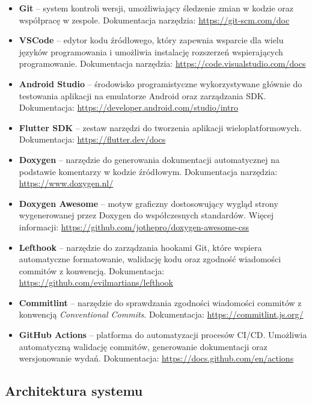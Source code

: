 \begin{itemize}
	\item \textbf{Git} – system kontroli wersji, umożliwiający śledzenie zmian w kodzie oraz współpracę w zespole. Dokumentacja narzędzia: \url{https://git-scm.com/doc}\cite{www14}
	\item \textbf{VSCode} – edytor kodu źródłowego, który zapewnia wsparcie dla wielu języków programowania i umożliwia instalację rozszerzeń wspierających programowanie. Dokumentacja narzędzia: \url{https://code.visualstudio.com/docs}\cite{www3}
	\item \textbf{Android Studio} – środowisko programistyczne wykorzystywane głównie do testowania aplikacji na emulatorze Android oraz zarządzania SDK. Dokumentacja: \url{https://developer.android.com/studio/intro}\cite{www15}
	\item \textbf{Flutter SDK} – zestaw narzędzi do tworzenia aplikacji wieloplatformowych. Dokumentacja: \url{https://flutter.dev/docs}\cite{www1}
	\item \textbf{Doxygen} – narzędzie do generowania dokumentacji automatycznej na podstawie komentarzy w kodzie źródłowym. Dokumentacja narzędzia: \url{https://www.doxygen.nl/}\cite{www16}
	\item \textbf{Doxygen Awesome} – motyw graficzny dostosowujący wygląd strony wygenerowanej przez Doxygen do współczesnych standardów. Więcej informacji: \url{https://github.com/jothepro/doxygen-awesome-css}\cite{www17}
	\item \textbf{Lefthook} – narzędzie do zarządzania hookami Git, które wspiera automatyczne formatowanie, walidację kodu oraz zgodność wiadomości commitów z konwencją. Dokumentacja: \url{https://github.com/evilmartians/lefthook}\cite{www18}
	\item \textbf{Commitlint} – narzędzie do sprawdzania zgodności wiadomości commitów z konwencją \textit{Conventional Commits}. Dokumentacja: \url{https://commitlint.js.org/}\cite{www19}
	\item \textbf{GitHub Actions} – platforma do automatyzacji procesów CI/CD. Umożliwia automatyczną walidację commitów, generowanie dokumentacji oraz wersjonowanie wydań. Dokumentacja: \url{https://docs.github.com/en/actions}\cite{www20}
\end{itemize}

\subsection{Architektura systemu}

